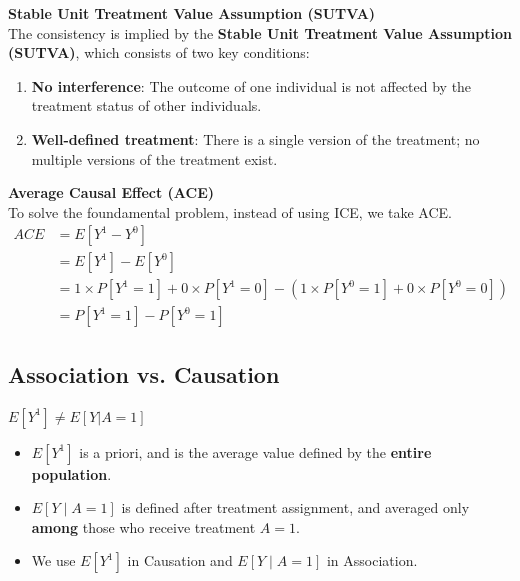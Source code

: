 \begin{remark}
    \textbf{Stable Unit Treatment Value Assumption (SUTVA)}\\
    The consistency is implied by the \textbf{Stable Unit Treatment Value Assumption (SUTVA)}, which consists of two key conditions:
    \begin{enumerate}
        \item \textbf{No interference}: The outcome of one individual is not affected by the treatment status of other individuals.
        \item \textbf{Well-defined treatment}: There is a single version of the treatment; no multiple versions of the treatment exist.
    \end{enumerate}
\end{remark}
\begin{definition}
    \textbf{Average Causal Effect (ACE)}\\
    To solve the foundamental problem, instead of using ICE, we take ACE.
    \begin{align*}
        ACE&=E\left[Y^1-Y^0\right]\\
        &=E\left[Y^1\right]-E\left[Y^0\right]\\
        &=1\times P[Y^1=1]+0\times P[Y^1=0]-(1\times P[Y^0=1]+0\times P[Y^0=0])\\
        &=P\left[Y^1=1\right]-P\left[Y^0=1\right]
    \end{align*}
\end{definition}
\subsection{Association vs. Causation}
\begin{remark}
    $E[Y^1]\neq E[Y|A=1]$
    \begin{itemize}
        \item $E\left[Y^1\right]$ is a priori, and is the average value defined by the \textbf{entire population}.
        \item $E[Y \mid A=1]$ is defined after treatment assignment, and averaged only \textbf{among} those who receive treatment $A=1$.
        \item We use $E\left[Y^1\right]$ in Causation and $E[Y \mid A=1]$ in Association.
    \end{itemize}
\end{remark}

